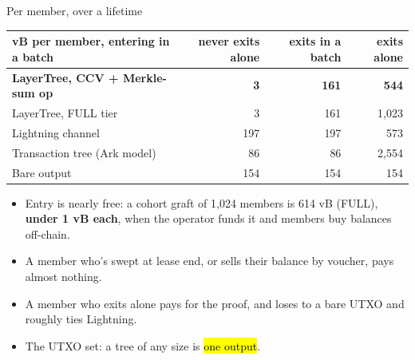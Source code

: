 \documentclass[aspectratio=169,10pt]{beamer}
\begin{document}
\begin{frame}{Per member, over a lifetime}
  \small
  \centering
  \begin{tabular}{@{}lrrr@{}}
    \toprule
    vB per member, entering in a batch & never exits alone & exits in a batch & exits alone \\ \midrule
    \textbf{LayerTree, CCV + Merkle-sum op} & \textbf{3} & \textbf{161} & \textbf{544} \\
    LayerTree, FULL tier & 3 & 161 & 1,023 \\
    Lightning channel & 197 & 197 & 573 \\
    Transaction tree (Ark model) & 86 & 86 & 2,554 \\
    Bare output & 154 & 154 & 154 \\
    \bottomrule
  \end{tabular}
  \vspace{1em}
  \begin{itemize}
    \item Entry is nearly free: a cohort graft of 1,024 members is 614 vB (FULL), \textbf{under 1 vB each}, when the operator funds it and members buy balances off-chain.
    \item A member who's swept at lease end, or sells their balance by voucher, pays almost nothing.
    \item A member who exits alone pays for the proof, and loses to a bare UTXO and roughly ties Lightning.
    \item The UTXO set: a tree of any size is \hl{one output}.
  \end{itemize}
\end{frame}
\end{document}
